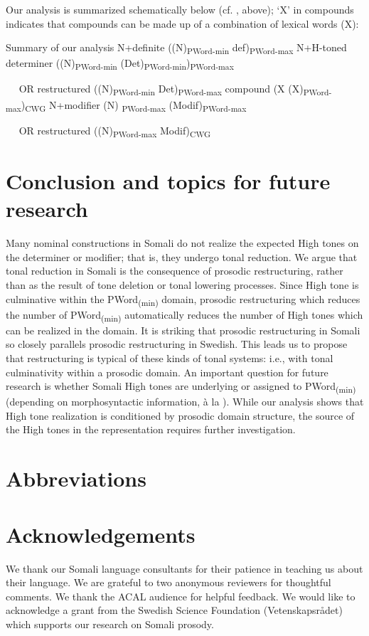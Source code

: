 \documentclass[output=paper]{langscibook}
\begin{document}
Our analysis is summarized schematically below (cf. , above); ‘X’ in compounds indicates that compounds can be made up of a combination of lexical words (X):


\ea Summary of our analysis  \label{ex:downing:26}
\ea N+definite        ((N)\textsubscript{PWord-min} def)\textsubscript{PWord-max}
\ex N+H-toned determiner  ((N)\textsubscript{PWord-min} (Det)\textsubscript{PWord-min})\textsubscript{PWord-max} 

  ~~ OR restructured    ((N)\textsubscript{PWord-min} Det)\textsubscript{PWord-max}
\ex compound        (X (X)\textsubscript{PWord-max})\textsubscript{CWG}
\ex N+modifier        (N)\textsubscript{ PWord-max} (Modif)\textsubscript{PWord-max} 

  ~~ OR restructured    ((N)\textsubscript{PWord-max} Modif)\textsubscript{CWG}
\z
\z


\section{Conclusion and topics for future research}

\label{sec:downing:5}
Many nominal constructions in Somali do not realize the expected High tones on the determiner or modifier; that is, they undergo tonal reduction. We argue that tonal reduction in Somali is the consequence of prosodic restructuring, rather than as the result of tone deletion or tonal lowering processes. Since High tone is culminative within the PWord\textsubscript{(min)} domain, prosodic restructuring which reduces the number of PWord\textsubscript{(min)} automatically reduces the number of High tones which can be realized in the domain. It is striking that prosodic restructuring in Somali so closely parallels prosodic restructuring in Swedish. This leads us to propose that restructuring is typical of these kinds of tonal systems: i.e., with tonal culminativity within a prosodic domain. An important question for future research is whether Somali High tones are underlying or assigned to PWord\textsubscript{(min)} (depending on morphosyntactic information, à la \citealt{Hyman1981}). While our analysis shows that High tone realization is conditioned by prosodic domain structure, the source of the High tones in the representation requires further investigation. 

\section*{Abbreviations}
\section*{Acknowledgements}
We thank our Somali language consultants for their patience in teaching us about their language. We are grateful to two anonymous reviewers for thoughtful comments. We thank the ACAL audience for helpful feedback. We would like to acknowledge a grant from the Swedish Science Foundation (Vetenskapsrådet) which supports our research on Somali prosody. 


{\sloppy
\printbibliography[heading=subbibliography,notkeyword=this] 
}
\end{document}
